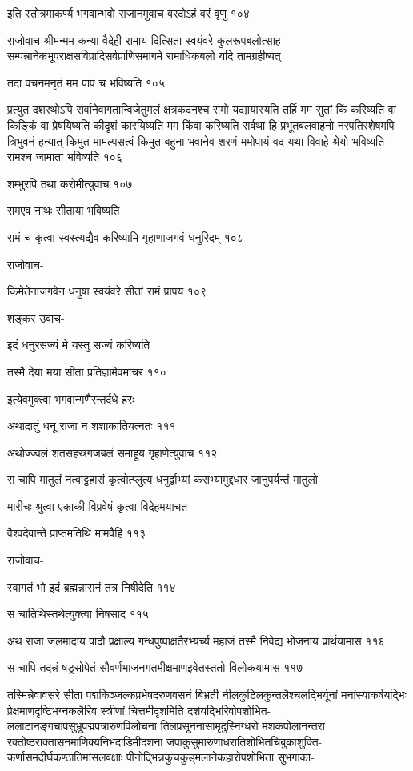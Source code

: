 इति स्तोत्रमाकर्ण्य भगवान्भवो राजानमुवाच वरदोऽहं वरं वृणु १०४

राजोवाच श्रीमन्मम कन्या वैदेही रामाय दित्सिता स्वयंवरे कुलरूपबलोत्साह
सम्पन्नानेकभूपराक्षसविप्रादिसर्वप्राणिसमागमे रामाधिकबलो यदि तामग्रहीष्यत्

तदा वचनमनृतं मम पापं च भविष्यति १०५

प्रत्युत दशरथोऽपि सर्वानेवागतान्विजेतुमलं क्षत्रकदनश्च रामो यद्यायास्यति तर्हि मम सुतां
किं करिष्यति वा किङ्किं वा प्रेषयिष्यति कीदृशं कारयिष्यति मम किंवा करिष्यति सर्वथा हि
प्रभूतबलवाहनो नरपतिरशेषमपि त्रिभुवनं हन्यात् किमुत मामल्पसत्वं किमुत बहुना भवानेव शरणं
ममोपायं वद यथा विवाहे श्रेयो भविष्यति रामश्च जामाता भविष्यति १०६

शम्भुरपि तथा करोमीत्युवाच १०७

रामएव नाथः सीताया भविष्यति

रामं च कृत्वा स्वस्त्यद्यैव करिष्यामि गृहाणाजगवं धनुरिदम् १०८

राजोवाच-

किमेतेनाजगवेन धनुषा स्वयंवरे सीतां रामं प्रापय १०९

शङ्कर उवाच-

इदं धनुरसज्यं मे यस्तु सज्यं करिष्यति

तस्मै देया मया सीता प्रतिज्ञामेवमाचर ११०

इत्येवमुक्त्वा भगवान्गणैरन्तर्दधे हरः

अथादातुं धनू राजा न शशाकातियत्नतः १११

अथोज्ज्वलं शतसहस्रगजबलं समाहूय गृहाणेत्युवाच ११२

स चापि मातुलं नत्वाट्टहासं कृत्वोत्प्लुत्य धनुर्द्वाभ्यां कराभ्यामुद्दधार जानुपर्यन्तं मातुलो

मारीचः श्रुत्वा एकाकी विप्रवेषं कृत्वा विदेहमयाचत

वैश्वदेवान्ते प्राप्तमतिथिं मामवैहि ११३

राजोवाच-

स्वागतं भो इदं ब्रह्मन्नासनं तत्र निषीदेति ११४

स चातिथिस्तथेत्युक्त्वा निषसाद ११५

अथ राजा जलमादाय पादौ प्रक्षाल्य गन्धपुष्पाक्षतैरभ्यर्च्य महाजं तस्मै निवेद्य भोजनाय
प्रार्थयामास ११६

स चापि तदन्नं षड्रसोपेतं सौवर्णभाजनगतमीक्षमाणइवेतस्ततो विलोकयामास ११७

तस्मिन्नेवावसरे सीता पद्मकिञ्जल्कप्रभेषदरुणवसनं बिभ्रती नीलकुटिलकुन्तलैश्चलद्भिर्यूनां
मनांस्याकर्षयद्भिः प्रेक्षमाणदृष्टिभग्नकलैरिव स्त्रीणां चित्तमीदृशमिति
दर्शयद्भिरिवोपशोभित-ललाटानङ्गचापसुभ्रूपद्मपत्रारुणविलोचना तिलप्रसूननासामृदुस्निग्धरो
मशकपोलानन्तरा रक्तोष्ठराक्तासनमाणिक्यनिभदाडिमीदशना
जपाकुसुमारुणाधरातिशोभितचिबुकाशुक्ति-कर्णासमदीर्घकण्ठातिमांसलवक्षाः
पीनोद्भिन्नकुचकुड्मलानेकहारोपशोभिता सुभगाका-

